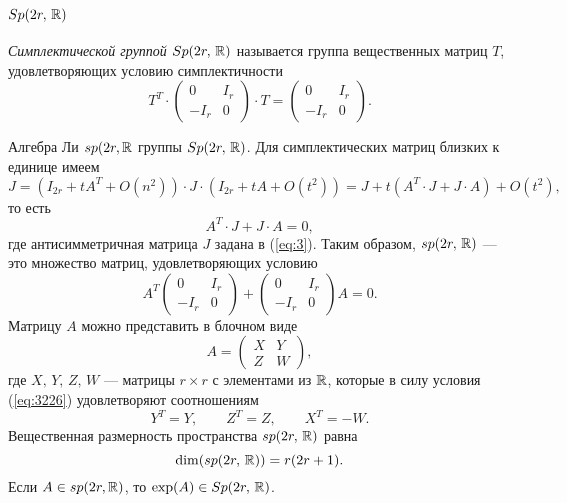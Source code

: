 \documentclass[a4paper,12pt]{article}
\begin{document}
\subsection{$Sp(2r,\, \mathbb{R})$ }
\begin{dfn}
	\emph{Симплектической группой $Sp(2r,\, \mathbb{R})$ } называется группа
	вещественных матриц $T$,
		удовлетворяющих условию симплектичности
	\begin{equation}
		T^T \cdot \begin{pmatrix} 0 & I_{r} \\ -I_{r} & 0 \end{pmatrix} 
		\cdot T= \begin{pmatrix} 0 & I_{r} \\ -I_{r} & 0 \end{pmatrix} 
		\label{eq:3}
	.\end{equation}

\end{dfn}
Алгебра Ли $sp(2r,\mathbb{R}$ группы $Sp(2r,\,\mathbb{R})$. Для симплектических матриц близких к
единице имеем
\begin{equation}
	J=(I_{2r} +t A^T + O(n^2)) \cdot J \cdot (I_{2r} +t A + O(t^2))=
	J+t(A^T \cdot J + J \cdot A) + O(t^2)
,\end{equation}
то есть
\begin{equation}
	A^T \cdot J + J \cdot A =0
,\end{equation}
где антисимметричная матрица $J$ задана в (\ref{eq:3}). Таким образом,
$sp(2r,\,\mathbb{R})$ --- это множество матриц, удовлетворяющих условию
\begin{equation}
	A^T \begin{pmatrix} 
0 & I_r \\
-I_r & 0
\end{pmatrix}
+
\begin{pmatrix} 
0 & I_r \\
-I_r & 0\end{pmatrix} A = 0
\label{eq:3226}
.\end{equation}
Матрицу $A$ можно представить в блочном виде
\begin{equation}
	A =
	\begin{pmatrix} 
	X & Y \\
Z & W\end{pmatrix} 
\label{eq:a}
,\end{equation}
где $X,\,Y,\,Z,\,W$ --- матрицы $r \times r$ с элементами из $\mathbb{R}$, которые в
силу условия (\ref{eq:3226}) удовлетворяют соотношениям
 \begin{equation}
	Y^T = Y, \qquad Z^T = Z, \qquad X^T = - W
.\end{equation}
Вещественная размерность пространства $sp(2r,\, \mathbb{R})$ равна
\begin{equation}
	\dim (sp(2r,\,\mathbb{R}))= r (2r +1)
.\end{equation}
Если $A \in sp(2r,\mathbb{R})$, то $\exp (A) \in  Sp(2r,\,\mathbb{R})$.
\end{document}
